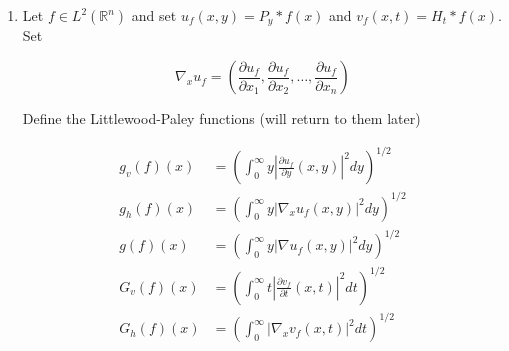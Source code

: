 \begin{enumerate}
\[
\int_{\mathbb{R}^n}|f(x+y)+f(x-y)-2 f(x)|^2 d x=4 \int_{\mathbb{R}^n}|\hat{f}(\xi)|^2|1-\cos (2 \pi \xi \cdot y)|^2 d \xi
\]


Remark 2 The first is the Dirichlet form of the Laplacian and the second is related to Dirichlet forms of some non-local (pseudo differential) operator-will see them a little later.

\begin{proof}
	This is proved using Plancherel's Theorem Fourier transform. 
	\begin{align*}
		\int _{\mathbb{R}^n} |\nabla f(x)|^2 dx
		&= \int _{\mathbb{R}^n} \left| \hat{\nabla  f} (\xi) \right| ^2 d \xi \\
		&= \int r_{\mathbb{R}^n} \left| \sum - 2 \pi i \xi_k \hat{f} (\xi) \right| ^2 d \xi \\
		&= \int _{\mathbb{R}^n} (2 \pi)^2 |\xi|^2 |\hat{f} (\xi)|^2 d \xi \\
		&= 4 \pi^2 \int_{\mathbb{R}^n}|\xi|^2|\hat{f}(\xi)|^2 d \xi \\
	.\end{align*}

	For the second part, we have
	\begin{align*}
		& \int_{\mathbb{R}^n}|f(x+y)+f(x-y)-2 f(x)|^2 d x \\
		&= \int_{\mathbb{R}^n} |\hat{f}(\xi) e^{-2 \pi i \xi \cdot y} + \hat{f}(\xi) e^{2 \pi i \xi \cdot y} - 2 \hat{f}(\xi)|^2 d \xi \\
		&= \int_{\mathbb{R}^n} |\hat{f}(\xi)|^2 |e^{-2 \pi i \xi \cdot y} + e^{2 \pi i \xi \cdot y} - 2|^2 d \xi \\
		&= \int_{\mathbb{R}^n}|\hat{f}(\xi)|^2|2- 2\cos (2 \pi \xi \cdot y)|^2 d \xi \\
		\end{align*}
\end{proof}


\item Let $f \in L^2\left(\mathbb{R}^n\right)$ and set $u_f(x, y)=P_y * f(x)$ and $v_f(x, t)=H_t * f(x)$. Set

\[
\nabla_x u_f=\left(\frac{\partial u_f}{\partial x_1}, \frac{\partial u_f}{\partial x_2}, \ldots, \frac{\partial u_f}{\partial x_n}\right)
\]


Define the Littlewood-Paley functions (will return to them later)

\[
\begin{aligned}
g_v(f)(x) & =\left(\int_0^{\infty} y\left|\frac{\partial u_f}{\partial y}(x, y)\right|^2 d y\right)^{1 / 2} \\
g_h(f)(x) & =\left(\int_0^{\infty} y\left|\nabla_x u_f(x, y)\right|^2 d y\right)^{1 / 2} \\
g(f)(x) & =\left(\int_0^{\infty} y\left|\nabla u_f(x, y)\right|^2 d y\right)^{1 / 2} \\
G_v(f)(x) & =\left(\int_0^{\infty} t\left|\frac{\partial v_f}{\partial t}(x, t)\right|^2 d t\right)^{1 / 2} \\
G_h(f)(x) & =\left(\int_0^{\infty}\left|\nabla_x v_f(x, t)\right|^2 d t\right)^{1 / 2}
\end{aligned}
\]



\end{enumerate}
